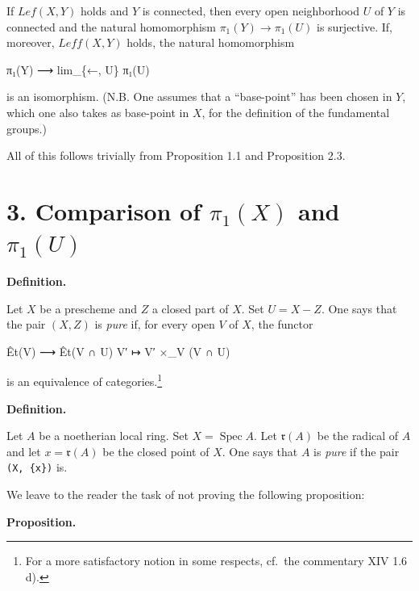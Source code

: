 \documentclass[
  11pt,
  a4paper,
]{book}
\newenvironment{Shaded}{}{}
\newcommand{\NormalTok}[1]{#1}
\begin{document}
If \(Lef(X, Y)\) holds and \(Y\) is connected, then every open
neighborhood \(U\) of \(Y\) is connected and the natural homomorphism
\(\pi_{1}(Y) \to \pi_{1}(U)\) is surjective. If, moreover,
\(Leff(X, Y)\) holds, the natural homomorphism

\begin{Shaded}
\begin{Highlighting}[]
\NormalTok{π₁(Y) ⟶ lim\_\{←, U\} π₁(U)}
\end{Highlighting}
\end{Shaded}

is an isomorphism. (N.B. One assumes that a ``base-point'' has been
chosen in \(Y\), which one also takes as base-point in \(X\), for the
definition of the fundamental groups.)

All of this follows trivially from Proposition 1.1 and Proposition 2.3.

\section{\texorpdfstring{3. Comparison of \(\pi_{1}(X)\) and
\(\pi_{1}(U)\)}{3. Comparison of \textbackslash pi\_\{1\}(X) and \textbackslash pi\_\{1\}(U)}}\label{comparison-of-pi_1x-and-pi_1u}

\textbf{Definition.}

Let \(X\) be a prescheme and \(Z\) a closed part of \(X\). Set
\(U = X - Z\). One says that the pair \((X, Z)\) is \emph{pure} if, for
every open \(V\) of \(X\), the functor

\begin{Shaded}
\begin{Highlighting}[]
\NormalTok{Êt(V) ⟶ Êt(V ∩ U)}
\NormalTok{V′ ↦ V′ ×\_V (V ∩ U)}
\end{Highlighting}
\end{Shaded}

is an equivalence of categories.\footnote{For a more satisfactory notion
  in some respects, cf.~the commentary XIV 1.6 d).}

\textbf{Definition.}

Let \(A\) be a noetherian local ring. Set \(X = \operatorname{Spec} A\).
Let \(\mathfrak{r}(A)\) be the radical of \(A\) and let
\(x = \mathfrak{r}(A)\) be the closed point of \(X\). One says that
\(A\) is \emph{pure} if the pair \texttt{(X,\ \{x\})} is.

We leave to the reader the task of not proving the following
proposition:

\textbf{Proposition.}
\end{document}
